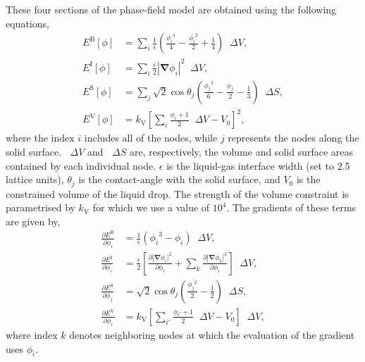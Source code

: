 \documentclass[aip,jcp,reprint,twocolumn]{revtex4-1}
\newcommand{\abs}[1]{\left| #1 \right|}
\newcommand{\grad}{\bm{\nabla}}
\newcommand{\upDelta}{\mathop{}\!\Delta}
\begin{document}
These four sections of the phase-field model are obtained using the following equations,
\begin{align}
  E^\mathrm{B}[\phi] &= \sum_i \frac{1}{\epsilon} \left( \frac{{\phi_i}^4}{4} - \frac{{\phi_i}^2}{2} + \frac{1}{4} \right) \upDelta V,\\
  E^\mathrm{I}[\phi] &= \sum_i \frac{\epsilon}{2} \abs{\grad \phi_i}^2 \upDelta V,\\
  E^\mathrm{S}[\phi] &= \sum_j \sqrt{2}\cos\theta_j \left( \frac{{\phi_j}^3}{6} - \frac{\phi_j}{2} - \frac{1}{3} \right) \upDelta S,\\
  E^\mathrm{V}[\phi] &= k_\mathrm{V} \left[ \sum_i \frac{\phi_i + 1}{2} \upDelta V - V_0 \right]^2,
\end{align}
where the index $i$ includes all of the nodes, while $j$ represents the nodes along the solid surface.
$\upDelta V$ and $\upDelta S$ are, respectively, the volume and solid surface areas contained by each individual node.
$\epsilon$ is the liquid-gas interface width (set to 2.5 lattice units), $\theta_j$ is the contact-angle with the solid surface, and $V_0$ is the constrained volume of the liquid drop.
The strength of the volume constraint is parametrised by $k_\mathrm{V}$ for which we use a value of $10^4$.
The gradients of these terms are given by,
\begin{align}
  \frac{\partial E^\mathrm{B}}{\partial \phi_i} &= \frac{1}{\epsilon} \left( {\phi_i}^3 - \phi_i \right) \upDelta V,\\
  \frac{\partial E^\mathrm{I}}{\partial \phi_i} &= \frac{\epsilon}{2} \left[
    \frac{\partial \abs{\grad \phi_i}^2}{\partial \phi_i} +
    \sum_k\frac{\partial \abs{\grad \phi_k}^2}{\partial \phi_i} \right] \upDelta V,\\
  \frac{\partial E^\mathrm{S}}{\partial \phi_j} &= \sqrt{2}\cos\theta_j \left( \frac{{\phi_j}^2}{2} - \frac{1}{2} \right) \upDelta S,\\
  \frac{\partial E^\mathrm{V}}{\partial \phi_i} &= k_\mathrm{V} \left[ \sum_{i'} \frac{\phi_{i'} + 1}{2} \upDelta V - V_0 \right] \upDelta V,
\end{align}
where index $k$ denotes neighboring nodes at which the evaluation of the gradient uses $\phi_i$.



\end{document}
